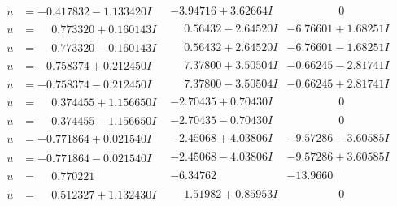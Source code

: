 \documentclass[1p]{elsarticle_modified}
\theoremstyle{definition}
\begin{document}
$$\begin{array}{c|c|c}
\begin{aligned}
u &= -0.417832 - 1.133420 I\end{aligned}
 & -3.94716 + 3.62664 I & \phantom{-0.000000 } 0 \\ \hline\begin{aligned}
u &= \phantom{-}0.773320 + 0.160143 I\end{aligned}
 & \phantom{-}0.56432 - 2.64520 I & -6.76601 + 1.68251 I \\ \hline\begin{aligned}
u &= \phantom{-}0.773320 - 0.160143 I\end{aligned}
 & \phantom{-}0.56432 + 2.64520 I & -6.76601 - 1.68251 I \\ \hline\begin{aligned}
u &= -0.758374 + 0.212450 I\end{aligned}
 & \phantom{-}7.37800 + 3.50504 I & -0.66245 - 2.81741 I \\ \hline\begin{aligned}
u &= -0.758374 - 0.212450 I\end{aligned}
 & \phantom{-}7.37800 - 3.50504 I & -0.66245 + 2.81741 I \\ \hline\begin{aligned}
u &= \phantom{-}0.374455 + 1.156650 I\end{aligned}
 & -2.70435 + 0.70430 I & \phantom{-0.000000 } 0 \\ \hline\begin{aligned}
u &= \phantom{-}0.374455 - 1.156650 I\end{aligned}
 & -2.70435 - 0.70430 I & \phantom{-0.000000 } 0 \\ \hline\begin{aligned}
u &= -0.771864 + 0.021540 I\end{aligned}
 & -2.45068 + 4.03806 I & -9.57286 - 3.60585 I \\ \hline\begin{aligned}
u &= -0.771864 - 0.021540 I\end{aligned}
 & -2.45068 - 4.03806 I & -9.57286 + 3.60585 I \\ \hline\begin{aligned}
u &= \phantom{-}0.770221\phantom{ +0.000000I}\end{aligned}
 & -6.34762\phantom{ +0.000000I} & -13.9660\phantom{ +0.000000I} \\ \hline\begin{aligned}
u &= \phantom{-}0.512327 + 1.132430 I\end{aligned}
 & \phantom{-}1.51982 + 0.85953 I & \phantom{-0.000000 } 0 \\ \hline\begin{aligned}

\end{aligned}
\end{array}$$
\end{document}
